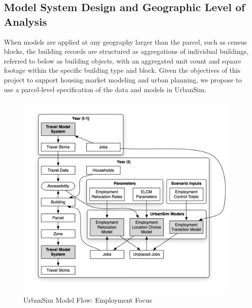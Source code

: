 \subsection{Model System Design and Geographic Level of Analysis}



When models are applied at any geography larger than the parcel, such as census blocks, the building records are structured as aggregations of individual buildings, referred to below as building objects, with an aggregated unit count and square footage within the specific building type and block. Given the objectives of this project to support housing market modeling and urban planning, we propose to use a parcel-level specification of the data and models in UrbanSim.  



\begin{figure}[ht]
\center
 \includegraphics[width=\textwidth]{graphics/ParcelEmploymentModel.png}
\caption{UrbanSim Model Flow: Employment Focus}
\label{fig:employment-models}
\end{figure}

